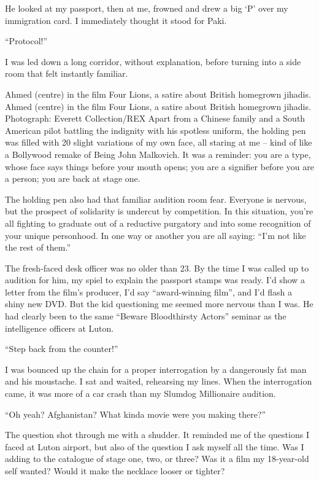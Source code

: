\documentclass[10pt,a4paper]{article}
\begin{document}
He looked at my passport, then at me, frowned and drew a big ‘P’ over my immigration card. I immediately thought it stood for Paki.

“Protocol!”

I was led down a long corridor, without explanation, before turning into a side room that felt instantly familiar.

Ahmed (centre) in the film Four Lions, a satire about British homegrown jihadis.
Ahmed (centre) in the film Four Lions, a satire about British homegrown jihadis. Photograph: Everett Collection/REX
Apart from a Chinese family and a South American pilot battling the indignity with his spotless uniform, the holding pen was filled with 20 slight variations of my own face, all staring at me – kind of like a Bollywood remake of Being John Malkovich. It was a reminder: you are a type, whose face says things before your mouth opens; you are a signifier before you are a person; you are back at stage one.

The holding pen also had that familiar audition room fear. Everyone is nervous, but the prospect of solidarity is undercut by competition. In this situation, you’re all fighting to graduate out of a reductive purgatory and into some recognition of your unique personhood. In one way or another you are all saying: “I’m not like the rest of them.”

The fresh-faced desk officer was no older than 23. By the time I was called up to audition for him, my spiel to explain the passport stamps was ready. I’d show a letter from the film’s producer, I’d say “award-winning film”, and I’d flash a shiny new DVD. But the kid questioning me seemed more nervous than I was. He had clearly been to the same “Beware Bloodthirsty Actors” seminar as the intelligence officers at Luton.

“Step back from the counter!”

I was bounced up the chain for a proper interrogation by a dangerously fat man and his moustache. I sat and waited, rehearsing my lines. When the interrogation came, it was more of a car crash than my Slumdog Millionaire audition.

“Oh yeah? Afghanistan? What kinda movie were you making there?”

The question shot through me with a shudder. It reminded me of the questions I faced at Luton airport, but also of the question I ask myself all the time. Was I adding to the catalogue of stage one, two, or three? Was it a film my 18-year-old self wanted? Would it make the necklace looser or tighter?
\end{document}
